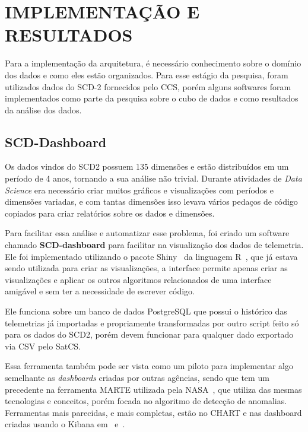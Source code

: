 
\chapter{IMPLEMENTAÇÃO E RESULTADOS}
\label{ch:impl}

Para a implementação da arquitetura, é necessário conhecimento sobre o domínio dos dados e como eles estão organizados.
Para esse estágio da pesquisa, foram utilizados dados do SCD-2 fornecidos pelo CCS, porém alguns softwares foram implementados como parte da pesquisa sobre o cubo de dados e como resultados da análise dos dados.

\section{SCD-Dashboard}
\label{ch:impl:dash}

Os dados vindos do SCD2 possuem 135 dimensões e estão distribuídos em um período de 4 anos, tornando a sua análise não trivial.
Durante atividades de \textit{Data Science} era necessário criar muitos gráficos e visualizações com períodos e dimensões variadas, e com tantas dimensões isso levava vários pedaços de código copiados para criar relatórios sobre os dados e dimensões.

Para facilitar essa análise e automatizar esse problema, foi criado um software chamado \textbf{SCD-dashboard} para facilitar na visualização dos dados de telemetria.
Ele foi implementado utilizando o pacote Shiny~\cite{changShinyWebApplication2019} da linguagem R~\cite{rcoreteamLanguageEnvironmentStatistical2018}, que já estava sendo utilizada para criar as visualizações, a interface permite apenas criar as visualizações e aplicar os outros algoritmos relacionados de uma interface amigável e sem ter a necessidade de escrever código.

Ele funciona sobre um banco de dados PostgreSQL que possui o histórico das telemetrias já importadas e propriamente transformadas por outro script feito só para os dados do SCD2, porém devem funcionar para qualquer dado exportado via CSV pelo SatCS.

Essa ferramenta também pode ser vista como um piloto para implementar algo semelhante as \textit{dashboards} criadas por outras agências, sendo que tem um precedente na ferramenta MARTE utilizada pela NASA~\cite{fernandezTelemetryAnomalyDetection2017}, que utiliza das mesmas tecnologias e conceitos, porém focada no algoritmo de detecção de anomalias.
Ferramentas mais parecidas, e mais completas, estão no CHART e nas dashboard criadas usando o Kibana em~\cite{mateikUsingBigData2017} e~\cite{zhangBigDataFramework2017}.


